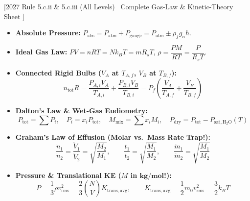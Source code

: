 \documentclass[10pt,twoside,openany,letterpaper]{book}
\begin{document}
\begin{quicksheet}\label{qr:06}
[2027 Rule 5.c.ii \& 5.c.iii (All Levels) \textbar\ Complete Gas-Law \& Kinetic-Theory Sheet ]

\begin{twocol}[0.49]
\begin{formulacard}
\scriptsize
\begin{itemize}
  \item \textbf{Absolute Pressure:} $P_{\mathrm{abs}} = P_{\mathrm{atm}} + P_{\mathrm{gauge}} = P_{\mathrm{atm}} \pm \rho_f g_n h$.
  \item \textbf{Ideal Gas Law:} $PV = nRT = Nk_B T = mR_s T$, $\rho = \dfrac{PM}{RT} = \dfrac{P}{R_s T}$.
  \item \textbf{Connected Rigid Bulbs ($V_A$ at $T_{A,f}$, $V_B$ at $T_{B,f}$):}
  \[
    n_{\mathrm{tot}}R = \frac{P_{A,i}V_A}{T_{A,i}} + \frac{P_{B,i}V_B}{T_{B,i}} = P_f\left(\frac{V_A}{T_{A,f}} + \frac{V_B}{T_{B,f}}\right)
  \]
  \item \textbf{Dalton's Law \& Wet-Gas Eudiometry:}
  \[
    P_{\mathrm{tot}} = \sum P_i, \quad P_i = x_i P_{\mathrm{tot}}, \quad M_{\mathrm{mix}} = \sum x_i M_i, \quad P_{\mathrm{dry}} = P_{\mathrm{tot}} - P_{\mathrm{sat,H_2O}}(T)
  \]
  \item \textbf{Graham's Law of Effusion (Molar vs.\ Mass Rate Trap!):}
  \[
    \boxed{\frac{\dot{n}_1}{\dot{n}_2} = \frac{\dot{V}_1}{\dot{V}_2} = \sqrt{\frac{M_2}{M_1}}}, \qquad \frac{t_1}{t_2} = \sqrt{\frac{M_1}{M_2}}, \qquad \boxed{\frac{\dot{m}_1}{\dot{m}_2} = \sqrt{\frac{M_1}{M_2}}}
  \]
\end{itemize}
\end{formulacard}
\nextcol[0.49]
\begin{formulacard}
\scriptsize
\begin{itemize}
  \item \textbf{Pressure \& Translational KE ($M$ in $\mathbf{\si{\kilogram\per\mole}}$!):}
  \[
    \boxed{P = \frac{1}{3}\rho v_{\mathrm{rms}}^2 = \frac{2}{3}\left(\frac{N}{V}\right)K_{\mathrm{trans,avg}}}, \qquad \boxed{K_{\mathrm{trans,avg}} = \frac{1}{2}m_0 v_{\mathrm{rms}}^2 = \frac{3}{2}k_B T}
\]
\end{itemize}
\end{formulacard}
\end{twocol}
\end{quicksheet}
\end{document}
